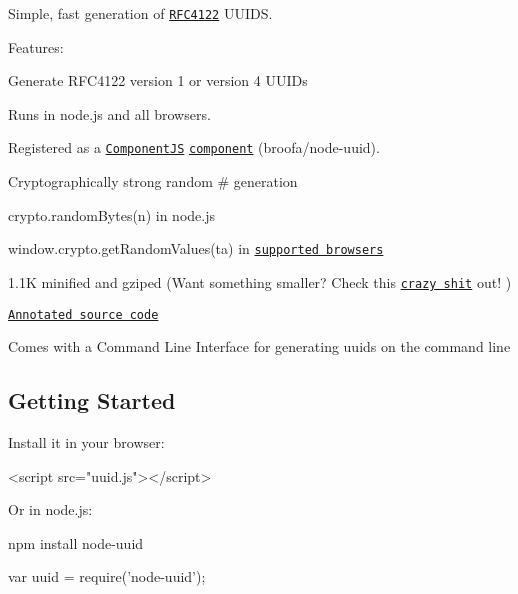Simple, fast generation of \href{http://www.ietf.org/rfc/rfc4122.txt}{\tt R\+F\+C4122} U\+U\+I\+DS.

Features\+:


\begin{DoxyItemize}
\item Generate R\+F\+C4122 version 1 or version 4 U\+U\+I\+Ds
\item Runs in node.\+js and all browsers.
\item Registered as a \href{https://github.com/component/component}{\tt Component\+JS} \href{https://github.com/component/component/wiki/Components}{\tt component} (\textquotesingle{}broofa/node-\/uuid\textquotesingle{}).
\item Cryptographically strong random \# generation
\begin{DoxyItemize}
\item {\ttfamily crypto.\+random\+Bytes(n)} in node.\+js
\item {\ttfamily window.\+crypto.\+get\+Random\+Values(ta)} in \href{https://developer.mozilla.org/en-US/docs/Web/API/RandomSource/getRandomValues#Browser_Compatibility}{\tt supported browsers}
\end{DoxyItemize}
\item 1.\+1K minified and gzip\textquotesingle{}ed (Want something smaller? Check this \href{https://gist.github.com/982883}{\tt crazy shit} out! )
\item \href{http://broofa.github.com/node-uuid/docs/uuid.html}{\tt Annotated source code}
\item Comes with a Command Line Interface for generating uuids on the command line
\end{DoxyItemize}

\subsection*{Getting Started}

Install it in your browser\+:


\begin{DoxyCode}
<script src="uuid.js"></script>
\end{DoxyCode}


Or in node.\+js\+:


\begin{DoxyCode}
npm install node-uuid
\end{DoxyCode}



\begin{DoxyCode}
var uuid = require('node-uuid');
\end{DoxyCode}


